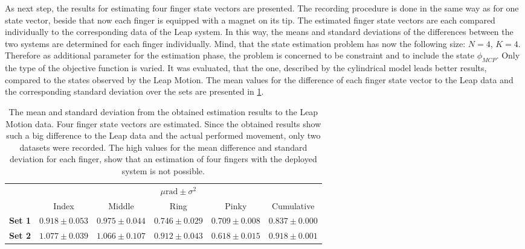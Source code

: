 As next step, the results for estimating four finger state vectors are presented. The recording procedure is done in the same way as for one state vector, beside that now each finger is equipped with a magnet on its tip. The estimated finger state vectors are each compared individually to the corresponding data of the Leap system. In this way, the means and standard deviations of the differences between the two systems are determined for each finger individually. Mind, that the state estimation problem has now the following size: $ N = 4 $, $ K = 4 $. Therefore as additional parameter for the estimation phase, the problem is concerned to be constraint and to include the state $ \phi_{MCP} $. Only the type of the objective function is varied. It was evaluated, that the one, described by the cylindrical model leads better results, compared to the states observed by the Leap Motion. The mean values for the difference of each finger state vector to the Leap data and the corresponding standard deviation over the sets are presented in \ref{tab:estSetFour}.\\
\begin{table}[h]
\centering
\begin{tabular}{l c c c c c}
\toprule
&  \multicolumn{5}{c}{$ \mu \si{\radian} \pm \sigma^{2} $} \\ \cmidrule{2-6}
& 			   				 Index 				 & Middle 			   & Ring 				 & Pinky 			   &  Cumulative \\ \midrule
\textbf{Set 1} &  $ 0.918 \pm 0.053 $ & $ 0.975 \pm 0.044 $ & $ 0.746 \pm 0.029 $ & $ 0.709 \pm 0.008 $ & $ 0.837 \pm 0.000 $ \\ 
\textbf{Set 2} &  $ 1.077 \pm 0.039 $ & $ 1.066 \pm 0.107 $ & $ 0.912 \pm 0.043 $ & $ 0.618 \pm 0.015 $ & $ 0.918 \pm 0.001 $ \\ \bottomrule
\end{tabular}
\caption[Difference of estimated states, compared to Leap Motion data for four finger estimation]
{The mean and standard deviation from the obtained estimation results to the Leap Motion data. Four finger state vectors are estimated. Since the obtained results show such a big difference to the Leap data and the actual performed movement, only two datasets were recorded. The high values for the mean difference and standard deviation for each finger, show that an estimation of four fingers with the deployed system is not possible.}
\label{tab:estSetFour}
\end{table}
